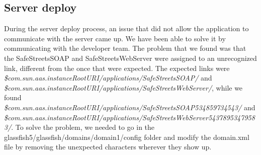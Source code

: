\documentclass[../ATD.tex]{subfiles}
\begin{document}
    \subsection{Server deploy}\label{subsec:server-deploy}
    During the server deploy process, an issue that did not allow the application to communicate with the server came up.
    We have been able to solve it by communicating with the developer team.
    The problem that we found was that the SafeStreetsSOAP and SafeStreetsWebServer were assigned to an unrecognized link, different from the once that were expected.
    The expected links were \textit{\${com.sun.aas.instanceRootURI}/applications/SafeStreetsSOAP/} and \textit{\${com.sun.aas.instanceRootURI}/applications/SafeStreetsWebServer/},
    while we found \textit{\${com.sun.aas.instanceRootURI}/applications/SafeStreetsSOAP534859734543/} and \newline\textit{\${com.sun.aas.instanceRootURI}/applications/SafeStreetsWebServer54378953479583/}.
    \newline To solve the problem, we needed to go in the glassfish5/glassfish/domains/domain1/config folder and modify the domain.xml file by removing the unexpected characters wherever they show up.
\end{document}
